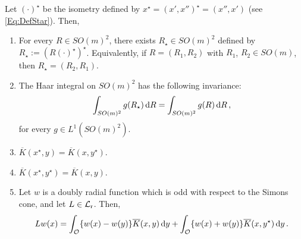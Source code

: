 \begin{lemma}
\label{Lemma:PropertiesStar}
Let $(\cdot)^\star$ be the isometry defined by $x^\star = (x',x'')^\star = (x'', x')$
(see \eqref{Eq:DefStar}).
Then,
\begin{enumerate}
\item 	
For every $R\in SO(m)^2$, there exists  $R_\star\in SO(m)^2$ defined by $R_\star :=
(R(\cdot)^\star)^\star$. Equivalently, if $R = (R_1, R_2)$ with $R_1$, $R_2 \in SO(m)$, then
$R_\star = (R_2, R_1)$.
\item
The Haar integral on $SO(m)^2$ has the following invariance:
\begin{equation}
\label{Eq:InvarianceByStar}
\int_{SO(m)^2} g(R_\star) \,\mathrm{d} R = \int_{SO(m)^2} g(R) \,\mathrm{d} R \,,
\end{equation}
for every $g \in L^1(SO(m)^2)$.
\item $\overline{K}(x^\star,y) = \overline{K} (x,y^\star)$.
\item $\overline{K}(x^\star,y^\star) = \overline{K} (x,y)$.
\item Let $w$ is a doubly radial function which is odd with respect to the Simons cone, and let $L\in \mathcal{L}_{\mathrm{r}}$. Then,
$$
Lw (x) = \int_{\mathcal{O}} \{w(x) - w(y) \} \overline{K}(x, y) \,\mathrm{d} y +  \int_{\mathcal{O}} \{w(x) + w(y) \} \overline{K}(x, y^\star) \,\mathrm{d} y \,.
$$
\end{enumerate}
\end{lemma}

